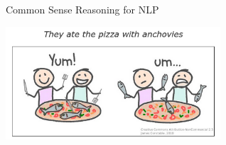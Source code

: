 \begin{frame}{Common Sense Reasoning for NLP}
\begin{center}
\includegraphics[width=8cm]{../img/ambiguity.png}
\end{center}
\end{frame}
%
%
%


